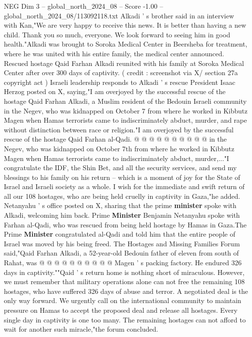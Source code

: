 \begin{textsample}{NEG Dim 3 – global\_north\_2024\_08 – Score -1.00 – global\_north\_2024\_08/113092118.txt}  \label{ex:f3_neg_326}
Alkadi ' s brother said in an interview with Kan,"We are very happy to receive this news.
It is better than having a new child.
Thank you so much, everyone.
We look forward to seeing him in good health."Alkadi was brought to Soroka Medical Center in Beersheba for treatment, where he was united with his entire family, the medical center announced.
Rescued hostage Qaid Farhan Alkadi reunited with his family at Soroka Medical Center after over 300 days of captivity. ( credit : screenshot via X/ section 27a copyright act ) Israeli leadership responds to Alkadi ' s rescue President Isaac Herzog posted on X, saying,"I am overjoyed by the successful rescue of the hostage Qaid Farhan Alkadi, a Muslim resident of the Bedouin Israeli community in the Negev, who was kidnapped on October 7 from where he worked in Kibbutz Magen when Hamas terrorists came to indiscriminately abduct, murder, and rape without distinction between race or religion."I am overjoyed by the successful rescue of the hostage Qaid Farhan al-Qadi. @ @ @ @ @ @ @ @ @ @ in the Negev, who was kidnapped on October 7th from where he worked in Kibbutz Magen when Hamas terrorists came to indiscriminately abduct, murder,..."I congratulate the IDF, the Shin Bet, and all the security services, and send my blessings to his family on his return -- which is a moment of joy for the State of Israel and Israeli society as a whole.
I wish for the immediate and swift return of all our 108 hostages, who are being held cruelly in captivity in Gaza,"he added.
Netanyahu ' s office posted on X, sharing that the prime \textbf{minister} spoke with Alkadi, welcoming him back.
Prime \textbf{Minister} Benjamin Netanyahu spoke with Farhan al-Qadi, who was rescued from being held hostage by Hamas in Gaza.The Prime \textbf{Minister} congratulated al-Qadi and told him that the entire people of Israel was moved by his being freed.
The Hostages and Missing Families Forum said,"Qaid Farhan Alkadi, a 52-year-old Bedouin father of eleven from south of Rahat, was @ @ @ @ @ @ @ @ @ @ Magen ' s packing factory.
He endured 326 days in captivity.""Qaid ' s return home is nothing short of miraculous.
However, we must remember that military operations alone can not free the remaining 108 hostages, who have suffered 326 days of abuse and terror.
A negotiated deal is the only way forward.
We urgently call on the international community to maintain pressure on Hamas to accept the proposed deal and release all hostages.
Every single day in captivity is one too many.
The remaining hostages can not afford to wait for another such miracle,"the forum concluded.

\end{textsample}
